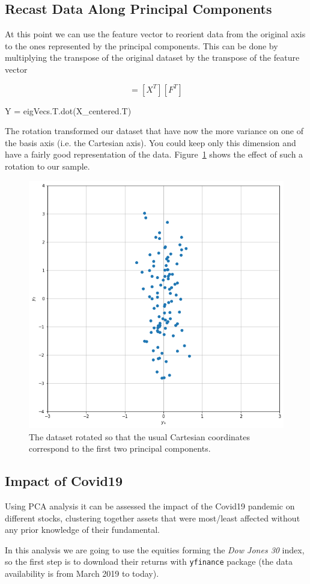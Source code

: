 \subsection{Recast Data Along Principal Components}
At this point we can use the feature vector to reorient data from the original axis to the ones represented by the principal components. 
This can be done by multiplying the transpose of the original dataset by the transpose of the feature vector

\begin{equation}
[Y] = [X^T][F^T]
\end{equation}

\begin{ipython}
Y = eigVecs.T.dot(X_centered.T)
\end{ipython}

The rotation transformed our dataset that have now the more variance on one of the basis axis (i.e. the Cartesian axis). 
You could keep only this dimension and have a fairly good representation of the data. Figure~\ref{fig:pca_rotated} shows the effect of such a rotation to our sample.
\clearpage
\begin{figure}[htb]
	\centering
	\includegraphics[width=0.5\linewidth]{figures/pca_rotated}
	\caption{The dataset rotated so that the usual Cartesian coordinates
		correspond to the first two principal components.}
	\label{fig:pca_rotated}
\end{figure}

\subsection{Impact of Covid19}
Using PCA analysis it can be assessed the impact of the Covid19 pandemic on different stocks, clustering together assets that were most/least affected without any prior knowledge of their fundamental.

In this analysis we are going to use the equities forming the \emph{Dow Jones 30} index, so the first step is to download their returns with \texttt{yfinance} package (the data availability is from March 2019 to today).

